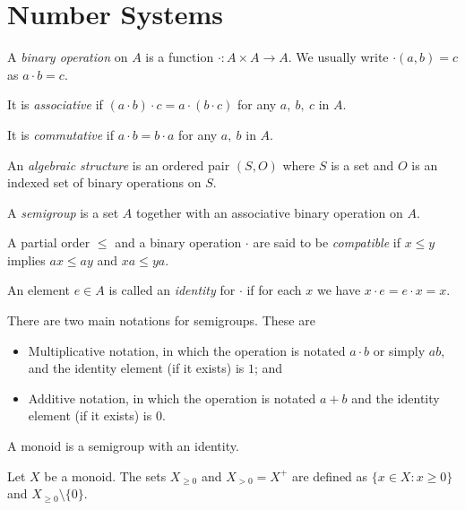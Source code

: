 \section{Number Systems}
  \begin{defn}
    A \emph{binary operation} on $A$ is a function $\cdot:A\times A\to A$. We
    usually write $\cdot(a,b)=c$ as $a\cdot b=c$.

    It is \emph{associative} if $(a\cdot b)\cdot c=a\cdot(b\cdot
    c)$ for any $a,\ b,\ c$ in $A$.

    It is \emph{commutative} if $a\cdot b=b\cdot a$ for any $a,\ b$ in $A$.
  \end{defn}
  \begin{defn}
      An \emph{algebraic structure} is an ordered pair $(S,O)$ where $S$ is a
      set and $O$ is an indexed set of binary operations on $S$.
  \end{defn}
  \begin{defn}
    A \emph{semigroup} is a set $A$ together with an associative binary
    operation on $A$.
  \end{defn}
  \begin{defn}
    A partial order $\le$ and a binary operation $\cdot$ are said to be
    \emph{compatible} if $x\le y$ implies $ax\le ay$ and $xa\le ya$.
  \end{defn}
  \begin{defn}
    An element $e\in A$ is called an \emph{identity} for $\cdot$ if for each $x$
    we have $x\cdot e=e\cdot x=x$.
  \end{defn}
  \begin{rem}
    There are two main notations for semigroups. These are
    \begin{itemize}
      \item 
        Multiplicative notation, in which the operation is notated $a\cdot b$ or
        simply $ab$, and the identity element (if it exists) is $1$; and
      \item Additive notation, in which the operation is notated $a+b$ and the
        identity element (if it exists) is $0$.
    \end{itemize}
  \end{rem}
  \begin{defn}
    A monoid is a semigroup with an identity.
  \end{defn}
  \begin{defn}
      Let $X$ be a monoid. The sets $X_{\ge 0}$ and $X_{>0}=X^+$ are defined as
      $\{x\in X:x\ge 0\}$ and $X_{\ge 0}\setminus\{0\}$.
  \end{defn}
